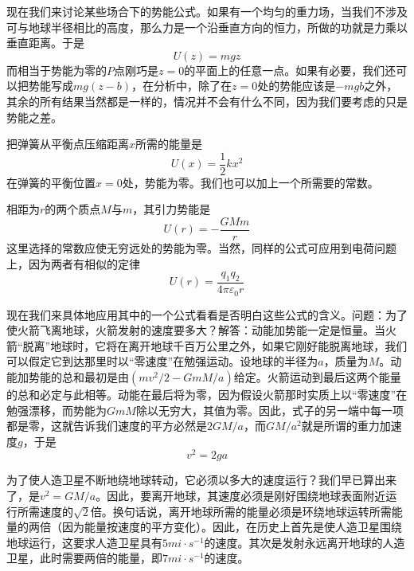 现在我们来讨论某些场合下的势能公式。如果有一个均匀的重力场，当我们不涉及可与地球半径相比的高度，那么力是一个沿垂直方向的恒力，所做的功就是力乘以垂直距离。于是
\begin{equation}
    \label{Eq:I:14:3}
    U(z)=mgz
\end{equation}
而相当于势能为零的$P$点刚巧是$z=0$的平面上的任意一点。如果有必要，我们还可以把势能写成$mg(z-b)$，在分析中，除了在$z=0$处的势能应该是$-mgb$之外，其余的所有结果当然都是一样的，情况并不会有什么不同，因为我们要考虑的只是势能之差。

把弹簧从平衡点压缩距离$x$所需的能量是
\begin{equation}
    \label{Eq:I:14:4}
    U(x)=\frac{1}{2}kx^2
\end{equation}
在弹簧的平衡位置$x=0$处，势能为零。我们也可以加上一个所需要的常数。

相距为$r$的两个质点$M$与$m$，其引力势能是
\begin{equation}
    \label{Eq:I:14:5}
    U(r)=-\frac{GMm}{r}
\end{equation}
这里选择的常数应使无穷远处的势能为零。当然，同样的公式可应用到电荷问题上，因为两者有相似的定律
\begin{equation}
    \label{Eq:I:14:6}
    U(r)=\frac{q_1q_2}{4\pi\varepsilon_0r}
\end{equation}

现在我们来具体地应用其中的一个公式看看是否明白这些公式的含义。问题：为了使火箭飞离地球，火箭发射的速度要多大？解答：动能加势能一定是恒量。当火箭“脱离”地球时，它将在离开地球千百万公里之外，如果它刚好能脱离地球，我们可以假定它到达那里时以“零速度”在勉强运动。设地球的半径为$a$，质量为$M$。动能加势能的总和最初是由$(mv^2/2-GmM/a)$给定。火箭运动到最后这两个能量的总和必定与此相等。动能在最后将为零，因为假设火箭那时实质上以“零速度”在勉强漂移，而势能为$GmM$除以无穷大，其值为零。因此，式子的另一端中每一项都是零，这就告诉我们速度的平方必然是$2GM/a$，而$GM/a^2$就是所谓的重力加速度$g$，于是
\begin{equation*}
    v^2=2ga
\end{equation*}

为了使人造卫星不断地绕地球转动，它必须以多大的速度运行？我们早已算出来了，是$v^2=GM/a$。因此，要离开地球，其速度必须是刚好围绕地球表面附近运行所需速度的$\sqrt{2}$倍。换句话说，离开地球所需的能量必须是环绕地球运转所需能量的两倍（因为能量按速度的平方变化）。因此，在历史上首先是使人造卫星围绕地球运行，这要求人造卫星具有$5 mi \cdot s^{-1}$的速度。其次是发射永远离开地球的人造卫星，此时需要两倍的能量，即$7 mi \cdot s^{-1}$的速度。

